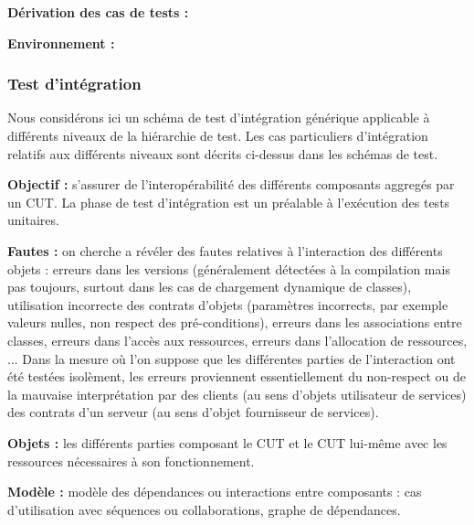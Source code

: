 \textbf{D\'erivation des cas de tests :}
  
\par
  
\textbf{Environnement :}
  
\par
  
\subsubsection{Test d'int\'egration}
  
    Nous consid\'erons ici un sch\'ema de test d'int\'egration
   g\'en\'erique applicable \`a diff\'erents niveaux de la
   hi\'erarchie de test. Les cas particuliers d'int\'egration
   relatifs aux diff\'erents niveaux sont d\'ecrits ci-dessus dans
   les sch\'emas de test. 
   
\textbf{Objectif :}
   s'assurer de l'interop\'erabilit\'e des
   diff\'erents composants aggreg\'es par un CUT. La phase de test
   d'int\'egration est un pr\'ealable \`a l'ex\'ecution des tests
   unitaires. 
\par
  
\textbf{Fautes :}
   on cherche a r\'ev\'eler des fautes
   relatives \`a l'interaction des diff\'erents objets : erreurs
   dans les versions (g\'en\'eralement d\'etect\'ees \`a la
   compilation mais pas toujours, surtout dans les cas de chargement
   dynamique de classes), utilisation incorrecte des contrats d'objets
   (param\`etres incorrects, par exemple valeurs nulles, non respect
   des pr\'e-conditions), erreurs dans les associations entre
   classes, erreurs dans l'acc\`es aux ressources, erreurs dans
   l'allocation de ressources, ... Dans la mesure o\`u l'on suppose
   que les diff\'erentes parties de l'interaction ont \'et\'e
   test\'ees isol\`ement, les erreurs proviennent essentiellement du
   non-respect ou de la mauvaise interpr\'etation par des clients (au
   sens d'objets utilisateur de services) des contrats d'un serveur
   (au sens d'objet fournisseur de services).
\par
  
\textbf{Objets :}
   les diff\'erents parties composant le CUT et
   le CUT lui-m\^eme avec les ressources n\'ecessaires \`a son fonctionnement.
\par
  
\textbf{Mod\`ele :}
   mod\`ele des d\'ependances ou
   interactions entre composants : cas d'utilisation avec s\'equences ou collaborations,
   graphe de d\'ependances. 
\par
  

